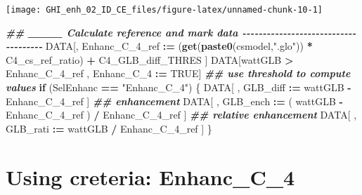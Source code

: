 \documentclass[
  10pt,
  a4paper,oneside]{article}
\newenvironment{Shaded}{\begin{snugshade}}{\end{snugshade}}
\newcommand{\AttributeTok}[1]{\textcolor[rgb]{0.13,0.29,0.53}{#1}}
\newcommand{\ConstantTok}[1]{\textcolor[rgb]{0.56,0.35,0.01}{#1}}
\newcommand{\ControlFlowTok}[1]{\textcolor[rgb]{0.13,0.29,0.53}{\textbf{#1}}}
\newcommand{\DecValTok}[1]{\textcolor[rgb]{0.00,0.00,0.81}{#1}}
\newcommand{\DocumentationTok}[1]{\textcolor[rgb]{0.56,0.35,0.01}{\textbf{\textit{#1}}}}
\newcommand{\FunctionTok}[1]{\textcolor[rgb]{0.13,0.29,0.53}{\textbf{#1}}}
\newcommand{\NormalTok}[1]{#1}
\newcommand{\SpecialCharTok}[1]{\textcolor[rgb]{0.81,0.36,0.00}{\textbf{#1}}}
\newcommand{\StringTok}[1]{\textcolor[rgb]{0.31,0.60,0.02}{#1}}
\begin{document}
\begin{Shaded}
\end{Shaded}

\begin{center}\texttt{[image: GHI\_enh\_02\_ID\_CE\_files/figure-latex/unnamed-chunk-10-1]} \end{center}

\begin{Shaded}
\begin{Highlighting}[]
\DocumentationTok{\#\# \_\_\_\_ Calculate reference and mark data  {-}{-}{-}{-}{-}{-}{-}{-}{-}{-}{-}{-}{-}{-}{-}{-}{-}{-}{-}{-}{-}{-}{-}{-}{-}{-}{-}{-}{-}{-}{-}{-}{-}{-}{-}{-}{-}}
\NormalTok{DATA[, Enhanc\_C\_4\_ref }\SpecialCharTok{:=}\NormalTok{ (}\FunctionTok{get}\NormalTok{(}\FunctionTok{paste0}\NormalTok{(csmodel,}\StringTok{".glo"}\NormalTok{)) }\SpecialCharTok{*}\NormalTok{ C4\_cs\_ref\_ratio) }\SpecialCharTok{+}\NormalTok{ C4\_GLB\_diff\_THRES ]}
\NormalTok{DATA[wattGLB }\SpecialCharTok{\textgreater{}}\NormalTok{ Enhanc\_C\_4\_ref ,}
\NormalTok{     Enhanc\_C\_4 }\SpecialCharTok{:=} \ConstantTok{TRUE}\NormalTok{]}
\DocumentationTok{\#\# use threshold to compute values}
\ControlFlowTok{if}\NormalTok{ (SelEnhanc }\SpecialCharTok{==} \StringTok{"Enhanc\_C\_4"}\NormalTok{) \{}
\NormalTok{    DATA[ , GLB\_diff }\SpecialCharTok{:=}\NormalTok{   wattGLB }\SpecialCharTok{{-}}\NormalTok{ Enhanc\_C\_4\_ref                    ] }\DocumentationTok{\#\# enhancement}
\NormalTok{    DATA[ , GLB\_ench }\SpecialCharTok{:=}\NormalTok{ ( wattGLB }\SpecialCharTok{{-}}\NormalTok{ Enhanc\_C\_4\_ref ) }\SpecialCharTok{/}\NormalTok{ Enhanc\_C\_4\_ref ] }\DocumentationTok{\#\# relative enhancement}
\NormalTok{    DATA[ , GLB\_rati }\SpecialCharTok{:=}\NormalTok{   wattGLB }\SpecialCharTok{/}\NormalTok{ Enhanc\_C\_4\_ref                    ]}
\NormalTok{\}}
\end{Highlighting}
\end{Shaded}

\FloatBarrier

\hypertarget{using-creteria-enhanc_c_4}{%
\section{Using creteria: Enhanc\_C\_4}\label{using-creteria-enhanc_c_4}}
\end{document}

